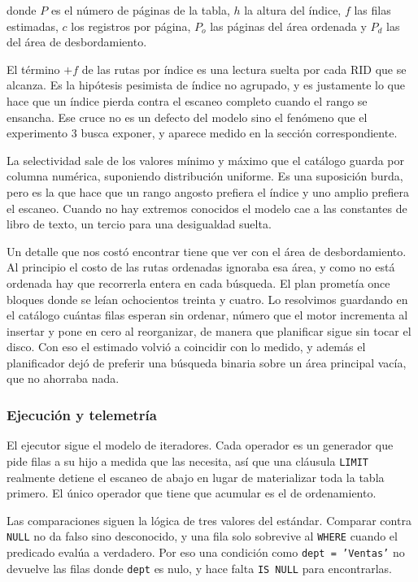 \documentclass[a4paper,12pt]{article}
\begin{document}
donde $P$ es el número de páginas de la tabla, $h$ la altura del índice, $f$ las
filas estimadas, $c$ los registros por página, $P_o$ las páginas del área
ordenada y $P_d$ las del área de desbordamiento.

El término $+f$ de las rutas por índice es una lectura suelta por cada RID que
se alcanza. Es la hipótesis pesimista de índice no agrupado, y es justamente lo
que hace que un índice pierda contra el escaneo completo cuando el rango se
ensancha. Ese cruce no es un defecto del modelo sino el fenómeno que el
experimento 3 busca exponer, y aparece medido en la sección correspondiente.

La selectividad sale de los valores mínimo y máximo que el catálogo guarda por
columna numérica, suponiendo distribución uniforme. Es una suposición burda,
pero es la que hace que un rango angosto prefiera el índice y uno amplio
prefiera el escaneo. Cuando no hay extremos conocidos el modelo cae a las
constantes de libro de texto, un tercio para una desigualdad suelta.

Un detalle que nos costó encontrar tiene que ver con el área de desbordamiento.
Al principio el costo de las rutas ordenadas ignoraba esa área, y como no está
ordenada hay que recorrerla entera en cada búsqueda. El plan prometía once
bloques donde se leían ochocientos treinta y cuatro. Lo resolvimos guardando en
el catálogo cuántas filas esperan sin ordenar, número que el motor incrementa al
insertar y pone en cero al reorganizar, de manera que planificar sigue sin tocar
el disco. Con eso el estimado volvió a coincidir con lo medido, y además el
planificador dejó de preferir una búsqueda binaria sobre un área principal
vacía, que no ahorraba nada.

\subsubsection{Ejecución y telemetría}

El ejecutor sigue el modelo de iteradores. Cada operador es un generador que
pide filas a su hijo a medida que las necesita, así que una cláusula
\texttt{LIMIT} realmente detiene el escaneo de abajo en lugar de materializar
toda la tabla primero. El único operador que tiene que acumular es el de
ordenamiento.

Las comparaciones siguen la lógica de tres valores del estándar. Comparar contra
\texttt{NULL} no da falso sino desconocido, y una fila solo sobrevive al
\texttt{WHERE} cuando el predicado evalúa a verdadero. Por eso una condición
como \texttt{dept = 'Ventas'} no devuelve las filas donde \texttt{dept} es nulo,
y hace falta \texttt{IS NULL} para encontrarlas.
\end{document}
